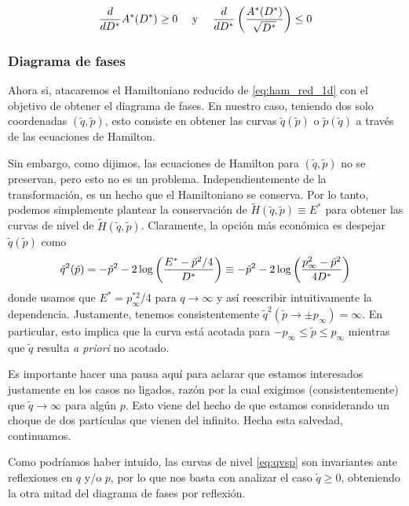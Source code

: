 \begin{equation}{\label{eq:props_area_red}}
\frac{d}{dD^*}A^{*}(D^*)\geq 0 \quad \text{ y } \quad \frac{d}{dD^*} \left(\frac{A^*(D^*)}{\sqrt{D^*}}\right) \leq 0
\end{equation}


\subsubsection{Diagrama de fases}{\label{sec:teo_fases}}

Ahora si, atacaremos el Hamiltoniano reducido de \eqref{eq:ham_red_1d} con el objetivo de obtener el diagrama de fases.
En nuestro caso, teniendo dos solo coordenadas $(\tilde{q},\tilde{p})$, esto consiste en obtener las curvas $\tilde{q}(\tilde{p})$ o $\tilde{p}(\tilde{q})$ a través de las ecuaciones de Hamilton.

Sin embargo, como dijimos, las ecuaciones de Hamilton para $(\tilde{q},\tilde{p})$ no se preservan, pero esto no es un problema.
Independientemente de la transformación, es un hecho que el Hamiltoniano se conserva.
Por lo tanto, podemos simplemente plantear la conservación de $\tilde{H}(\tilde{q},\tilde{p})\equiv E^*$ para obtener las curvas de nivel de $\tilde{H}(\tilde{q},\tilde{p})$.
Claramente, la opción más económica es despejar $\tilde{q}(\tilde{p})$ como
\begin{equation}{\label{eq:qvsp}}
\tilde{q}^2(\tilde{p}) = -\tilde{p}^2 - 2 \log\left( \frac{E^*-\tilde{p}^2/4}{D^*} \right) \equiv -\tilde{p}^2 - 2 \log\left( \frac{p_\infty^2-\tilde{p}^2}{4D^*} \right)
\end{equation}
donde usamos que $E^* = p_\infty^{*2}/4$ para $q\to\infty$ y así reescribir intuitivamente la dependencia.
Justamente, tenemos consistentemente $\tilde{q}^2(\tilde{p}\to\pm p_\infty) = \infty$.
En particular, esto implica que la curva está acotada para $-p_\infty \leq \tilde{p} \leq p_\infty$ mientras que $\tilde{q}$ resulta \textit{a priori} no acotado.

Es importante hacer una pausa aquí para aclarar que estamos interesados justamente en los casos no ligados, razón por la cual exigimos (consistentemente) que $\tilde{q}\to\infty$ para algún $p$. 
Esto viene del hecho de que estamos considerando un choque de dos partículas que vienen del infinito.
Hecha esta salvedad, continuamos.

Como podríamos haber intuido, las curvas de nivel \eqref{eq:qvsp} son invariantes ante reflexiones en $q$ y/o $p$, por lo que nos basta con analizar el caso $\tilde{q}\geq 0$, obteniendo la otra mitad del diagrama de fases por reflexión.

